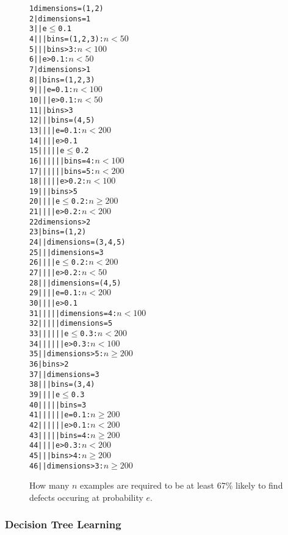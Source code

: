 \begin{figure}
\renewcommand{\baselinestretch}{0.75}
\begin{alltt}\scriptsize 
     1	  dimensions = (1,2)
     2	  |   dimensions = 1
     3	  |   |   e \(\le\) 0.1
     4	  |   |   |   bins = (1,2,3) : \(n < 50\) 
     5	  |   |   |   bins > 3       : \(n < 100\) 
     6	  |   |   e > 0.1 : \(n < 50\)  
     7	  |   dimensions > 1
     8	  |   |   bins = (1,2,3)
     9	  |   |   |   e = 0.1 : \(n < 100\) 
    10	  |   |   |   e > 0.1 : \(n < 50\)  
    11	  |   |   bins > 3
    12	  |   |   |   bins = (4,5)
    13	  |   |   |   |   e = 0.1 : \(n < 200\) 
    14	  |   |   |   |   e > 0.1
    15	  |   |   |   |   |   e \(\le\) 0.2
    16	  |   |   |   |   |   |   bins = 4 : \(n < 100\) 
    17	  |   |   |   |   |   |   bins = 5 : \(n < 200\) 
    18	  |   |   |   |   |   e > 0.2      : \(n < 100\) 
    19	  |   |   |   bins > 5
    20	  |   |   |   |   e \(\le\) 0.2 : \(n \ge 200 \) 
    21	  |   |   |   |   e > 0.2 : \(n < 200\)
    22	  dimensions > 2
    23	  |   bins = (1,2)
    24	  |   |   dimensions = (3,4,5)
    25	  |   |   |   dimensions = 3
    26	  |   |   |   |   e \(\le\) 0.2 : \(n < 200\) 
    27	  |   |   |   |   e > 0.2 : \(n < 50\) 
    28	  |   |   |   dimensions = (4,5)
    29	  |   |   |   |   e = 0.1 : \(n < 200\) 
    30	  |   |   |   |   e > 0.1
    31	  |   |   |   |   |   dimensions = 4 : \(n < 100\) 
    32	  |   |   |   |   |   dimensions = 5
    33	  |   |   |   |   |   |   e \(\le\) 0.3 : \(n < 200\) 
    34	  |   |   |   |   |   |   e > 0.3 : \(n < 100\) 
    35	  |   |   dimensions > 5 : \(n \ge 200 \) 
    36	  |   bins > 2
    37	  |   |   dimensions = 3
    38	  |   |   |   bins = (3,4)
    39	  |   |   |   |   e \(\le\) 0.3
    40	  |   |   |   |   |   bins = 3
    41	  |   |   |   |   |   |   e = 0.1 : \(n \ge 200 \) 
    42	  |   |   |   |   |   |   e > 0.1 : \(n < 200\) 
    43	  |   |   |   |   |   bins = 4 : \(n \ge 200 \) 
    44	  |   |   |   |   e > 0.3 : \(n < 200\) 
    45	  |   |   |   bins > 4 : \(n \ge 200 \) 
    46	  |   |   dimensions > 3 : \(n \ge 200 \)
\end{alltt}
\caption{How many $n$ examples are required to be at least 67\%
likely to find defects occuring at probability $e$.}\label{fig:dtree}
\end{figure}
\subsubsection{Decision Tree Learning}

